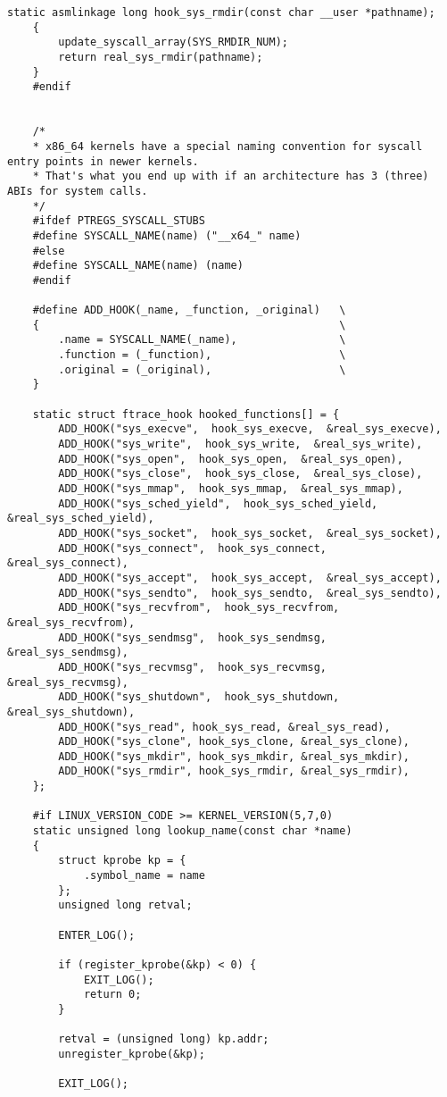 \begin{lstlisting}[caption={листинг файла hooks.c}]
	static asmlinkage long hook_sys_rmdir(const char __user *pathname);
	{
		update_syscall_array(SYS_RMDIR_NUM);
		return real_sys_rmdir(pathname);
	}
	#endif
	
	
	/*
	* x86_64 kernels have a special naming convention for syscall entry points in newer kernels.
	* That's what you end up with if an architecture has 3 (three) ABIs for system calls.
	*/
	#ifdef PTREGS_SYSCALL_STUBS
	#define SYSCALL_NAME(name) ("__x64_" name)
	#else
	#define SYSCALL_NAME(name) (name)
	#endif
	
	#define ADD_HOOK(_name, _function, _original)   \
	{                                               \
		.name = SYSCALL_NAME(_name),                \
		.function = (_function),                    \
		.original = (_original),                    \
	}
	
	static struct ftrace_hook hooked_functions[] = {
		ADD_HOOK("sys_execve",  hook_sys_execve,  &real_sys_execve),
		ADD_HOOK("sys_write",  hook_sys_write,  &real_sys_write),
		ADD_HOOK("sys_open",  hook_sys_open,  &real_sys_open),
		ADD_HOOK("sys_close",  hook_sys_close,  &real_sys_close),
		ADD_HOOK("sys_mmap",  hook_sys_mmap,  &real_sys_mmap),
		ADD_HOOK("sys_sched_yield",  hook_sys_sched_yield,  &real_sys_sched_yield),
		ADD_HOOK("sys_socket",  hook_sys_socket,  &real_sys_socket),
		ADD_HOOK("sys_connect",  hook_sys_connect,  &real_sys_connect),
		ADD_HOOK("sys_accept",  hook_sys_accept,  &real_sys_accept),
		ADD_HOOK("sys_sendto",  hook_sys_sendto,  &real_sys_sendto),
		ADD_HOOK("sys_recvfrom",  hook_sys_recvfrom,  &real_sys_recvfrom),
		ADD_HOOK("sys_sendmsg",  hook_sys_sendmsg,  &real_sys_sendmsg),
		ADD_HOOK("sys_recvmsg",  hook_sys_recvmsg,  &real_sys_recvmsg),
		ADD_HOOK("sys_shutdown",  hook_sys_shutdown,  &real_sys_shutdown),
		ADD_HOOK("sys_read", hook_sys_read, &real_sys_read),
		ADD_HOOK("sys_clone", hook_sys_clone, &real_sys_clone),
		ADD_HOOK("sys_mkdir", hook_sys_mkdir, &real_sys_mkdir),
		ADD_HOOK("sys_rmdir", hook_sys_rmdir, &real_sys_rmdir),
	};
	
	#if LINUX_VERSION_CODE >= KERNEL_VERSION(5,7,0)
	static unsigned long lookup_name(const char *name)
	{
		struct kprobe kp = {
			.symbol_name = name
		};
		unsigned long retval;
		
		ENTER_LOG();
		
		if (register_kprobe(&kp) < 0) {
			EXIT_LOG();
			return 0;
		}
		
		retval = (unsigned long) kp.addr;
		unregister_kprobe(&kp);
		
		EXIT_LOG();
		

\end{lstlisting}
